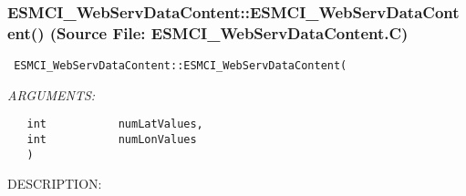  
\setlength{\oldparskip}{\parskip}
\setlength{\parskip}{1.5ex}
\setlength{\oldparindent}{\parindent}
\setlength{\parindent}{0pt}
\setlength{\oldbaselineskip}{\baselineskip}
\setlength{\baselineskip}{11pt}
 
\def\bv{\begin{verbatim}}
\def\ev{\end{verbatim}}
\def\be{\begin{equation}}
\def\ee{\end{equation}}
\def\bea{\begin{eqnarray}}
\def\eea{\end{eqnarray}}
\def\bi{\begin{itemize}}
\def\ei{\end{itemize}}
\def\bn{\begin{enumerate}}
\def\en{\end{enumerate}}
\def\bd{\begin{description}}
\def\ed{\end{description}}
\def\({\left (}
\def\){\right )}
\def\[{\left [}
\def\]{\right ]}
\def\<{\left  \langle}
\def\>{\right \rangle}
\def\cI{{\cal I}}
\def\diag{\mathop{\rm diag}}
\def\tr{\mathop{\rm tr}}


 
\subsubsection{ESMCI\_WebServDataContent::ESMCI\_WebServDataContent() (Source File: ESMCI\_WebServDataContent.C)}


  
\begin{verbatim} ESMCI_WebServDataContent::ESMCI_WebServDataContent(\end{verbatim}{\em ARGUMENTS:}
\begin{verbatim}   int           numLatValues,
   int           numLonValues
   )\end{verbatim}
{\sf DESCRIPTION:\\ }


